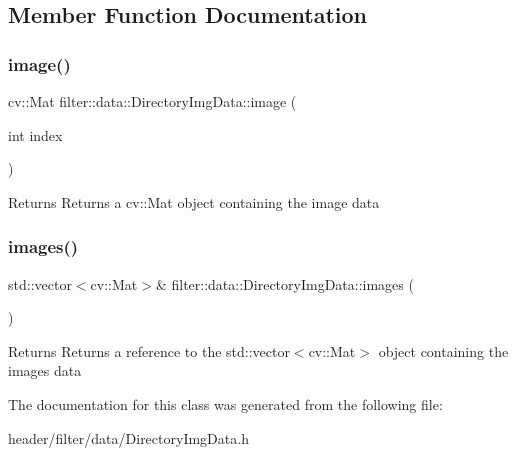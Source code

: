 \subsection{Member Function Documentation}
\mbox{\label{classfilter_1_1data_1_1_directory_img_data_a2d2f7b78ebdc9adc1842447bec9f4fcb}} 
\subsubsection{\texorpdfstring{image()}{image()}}
{\footnotesize\ttfamily cv\+::\+Mat filter\+::data\+::\+Directory\+Img\+Data\+::image (\begin{DoxyParamCaption}\item[{int}]{index }\end{DoxyParamCaption})\hspace{0.3cm}{\ttfamily [inline]}}

\begin{DoxyReturn}{Returns}
Returns a cv\+::\+Mat object containing the image\textquotesingle{} data 
\end{DoxyReturn}
\mbox{\label{classfilter_1_1data_1_1_directory_img_data_ae582abd2529b225ccdfe4d268333051f}} 
\subsubsection{\texorpdfstring{images()}{images()}}
{\footnotesize\ttfamily std\+::vector$<$cv\+::\+Mat$>$\& filter\+::data\+::\+Directory\+Img\+Data\+::images (\begin{DoxyParamCaption}{ }\end{DoxyParamCaption})\hspace{0.3cm}{\ttfamily [inline]}}

\begin{DoxyReturn}{Returns}
Returns a reference to the std\+::vector$<$cv\+::\+Mat$>$ object containing the images\textquotesingle{} data 
\end{DoxyReturn}


The documentation for this class was generated from the following file\+:\begin{DoxyCompactItemize}
\item 
header/filter/data/Directory\+Img\+Data.\+h\end{DoxyCompactItemize}
